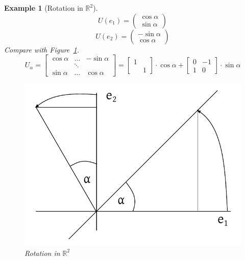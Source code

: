\documentclass{article}
\newcounter{lecref}[section]
\numberwithin{lecref}{section}
\newtheorem{example}[lecref]{Example}
\newcommand{\vectwo}[2]{\begin{pmatrix} #1 \\ #2 \end{pmatrix}}
\begin{document}
\begin{example}[Rotation in $\mathbb R^2$]
  \[ U(e_1) = \vectwo{\cos\alpha}{\sin\alpha} \]
  \[ U(e_2) = \vectwo{-\sin\alpha}{\cos\alpha} \]
  Compare with Figure~\ref{img:rotr2}.
  \[
    U_{\alpha} = \begin{bmatrix}
      \cos\alpha & \dots & -\sin\alpha \\
                 & \ddots & \\
      \sin\alpha & \dots & \cos\alpha
    \end{bmatrix}
    = \begin{bmatrix} 1 & \\ & 1 \end{bmatrix} \cdot \cos{\alpha} + \begin{bmatrix} 0 & -1 \\ 1 & 0 \end{bmatrix} \cdot \sin\alpha
  \]
  \begin{figure}[t]
    \begin{center}
      \includegraphics{img/13_rotation.pdf}
      \caption{Rotation in $\mathbb R^2$}
      \label{img:rotr2}
    \end{center}
  \end{figure}
\end{example}
\end{document}
